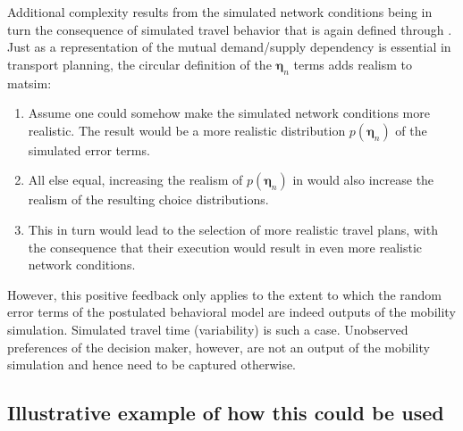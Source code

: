 Additional complexity results from the simulated network conditions
being in turn the consequence of simulated travel behavior that is
again defined through . 
Just as a representation
of the mutual demand/supply dependency is essential in transport planning,
the circular definition of the $\boldsymbol{\eta}_n$ terms adds realism to \gls{matsim}:
\begin{enumerate}
\item Assume one could somehow make the simulated network conditions more
realistic. The result would be a more realistic distribution $p(\boldsymbol{\eta}_n)$
of the simulated error terms.
\item All else equal, increasing the realism of $p(\boldsymbol{\eta}_n)$ in 
would also increase the realism of the resulting choice distributions.
\item This in turn would lead to the selection of more realistic travel
plans, with the consequence that their execution would result in even
more realistic network conditions.
\end{enumerate}
However, this positive feedback only applies to the extent to which
the random error terms of the postulated behavioral model are indeed
outputs of the mobility simulation. Simulated travel time (variability)
is such a case. Unobserved preferences of the decision maker, however,
are not an output of the mobility simulation and hence need to be
captured otherwise. 


\subsection{Illustrative example of how this could be used}

